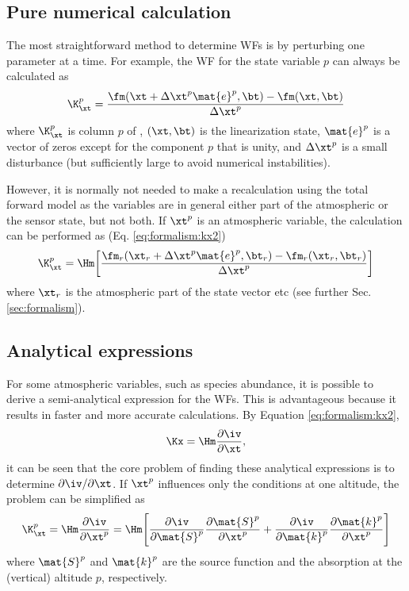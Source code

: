   \subsection{Pure numerical calculation} 
  The most straightforward method to determine WFs is by perturbing
  one parameter at a time. For example, the WF for the state variable
  $p$ can always be calculated as
  \begin{equation}
    \K_{\xt}^p = \frac{\fm(\xt+\Delta\xt^p\mat{e}^p,\bt)-\fm(\xt,\bt)}
                                     {\Delta\xt^p}
   \label{eq:wfuns:perturb}
  \end{equation}
  where $\K_{\xt}^p$ is column $p$ of \Kx, $(\xt,\bt)$ is the
  linearization state, $\mat{e}^p$ is a vector of zeros except for the
  component $p$ that is unity, and $\Delta\xt^p$ is a small disturbance
  (but sufficiently large to avoid numerical instabilities).
  
  However, it is normally not needed to make a recalculation using the
  total forward model as the variables are in general either part of the
  atmospheric or the sensor state, but not both. If $\xt^p$ is an atmospheric
  variable, the calculation can be performed as (Eq. \ref{eq:formalism:kx2})
  \begin{equation}
    \K_{\xt}^p = \Hm \bigg[
    \frac{\fm_r(\xt_r+\Delta\xt^p\mat{e}^p,\bt_r)-
           \fm_r(\xt_r,\bt_r)}  {\Delta\xt^p} \bigg]
   \label{eq:wfuns:Hpert}
  \end{equation}
  where $\xt_r$ is the atmospheric part of the state vector etc (see
  further Sec. \ref{sec:formalism}).
 

  \subsection{Analytical expressions} 
  \label{sec:wfuns:approaches:anal}
  For some atmospheric variables, such as species abundance, it is
  possible to derive a semi-analytical expression for the WFs. This is
  advantageous because it results in faster and more accurate
  calculations. By Equation \ref{eq:formalism:kx2},
  \begin{eqnarray*}
    \Kx = \Hm\frac{\partial\iv}{\partial \xt},
  \end{eqnarray*}
  it can be seen that the core problem of finding these analytical
  expressions is to determine $\partial\iv / \partial \xt$. 
  If $\xt^p$ influences only the conditions at one altitude, the
  problem can be simplified as \citep[][Eq. 43]{eriksson:00a}
  \begin{equation}
    \K_{\xt}^p = \Hm \frac{\partial\iv}{\partial \xt^p} = 
      \Hm \Bigg[ \frac{\partial\iv}{\partial \mat{S}^p}
                 \frac{\partial \mat{S}^p}{\partial \xt^p} +
                 \frac{\partial\iv}{\partial \mat{k}^p}
                 \frac{\partial \mat{k}^p}{\partial \xt^p} \Bigg]
   \label{eq:wfuns:taylor}
  \end{equation}
  where $\mat{S}^p$ and $\mat{k}^p$ are the source function and the
  absorption at the (vertical) altitude $p$, respectively.
  
